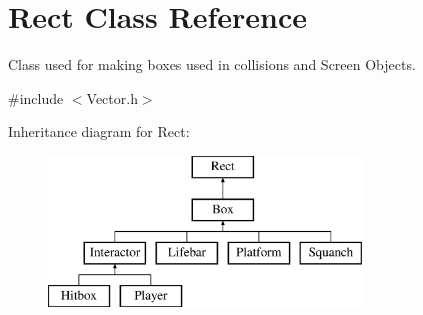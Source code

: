 \hypertarget{class_rect}{}\section{Rect Class Reference}
\label{class_rect}


Class used for making boxes used in collisions and Screen Objects.  




{\ttfamily \#include $<$Vector.\+h$>$}

Inheritance diagram for Rect\+:\begin{figure}[H]
\begin{center}
\leavevmode
\includegraphics[height=4.000000cm]{class_rect}
\end{center}
\end{figure}
